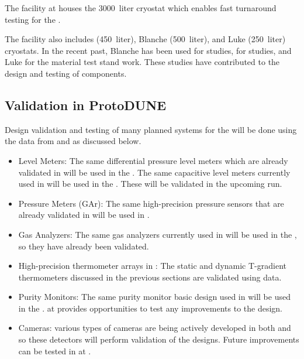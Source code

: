 The  facility at  houses the  \SI {3000} {liter} cryostat which enables fast turnaround testing for the  . 

The  facility also includes   (\SI {450} {liter}), Blanche (\SI {500} {liter}), and Luke (\SI {250} {liter}) cryostats. %
In the recent past, Blanche has been used for  studies,   for  studies, and Luke for the material test stand work. These studies have contributed to the design and testing of   components.

\subsection{Validation in ProtoDUNE}
\label{sec:pdsp-cryo-valid}

Design validation and testing of many planned  systems for
the  will be done using the data from
 and  as discussed below.

\begin{itemize}
	\item Level Meters: The same differential pressure level meters
	      which are already validated in  will be used in the . The same capacitive level meters currently used in
	       will be used in the . These will be
	      validated in the upcoming  run.
	      
	\item Pressure Meters (GAr): The same high-precision pressure sensors that are already validated in  will be used in  .
	
	\item Gas Analyzers: The same gas analyzers currently used in
	       will be used in the , so they have already
	      been validated.
	      
	\item High-precision thermometer arrays in : The static
	      and dynamic T-gradient thermometers discussed in the previous sections are validated using  data.
	      
	\item Purity Monitors: The same purity monitor basic design used in  will be used in the .  at  provides opportunities to
	      test any improvements to the design.
	\item Cameras: various types of cameras are being actively
	      developed in both  and  so these detectors will perform validation of the 
	      designs. Future
	      improvements can be tested in  at . %
\end{itemize}


